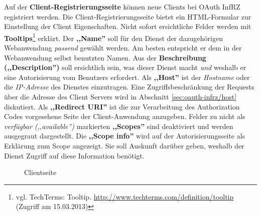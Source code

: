 \documentclass[12pt,a4paper,pointednumbers,abstracton]{scrartcl}
\begin{document}
Auf der \textbf{Client-Registrierungsseite} können neue Clients bei OAuth InfRZ registriert werden.
Die Client-Registrierungsseite bietet ein HTML-Formular zur Einstellung der Client Eigenschaften.
Nicht sofort ersichtliche Felder werden mit \textbf{Tooltips}\footnote{vgl. TechTerms: Tooltip. \url{http://www.techterms.com/definition/tooltip} (Zugriff am 15.03.2013)} erklärt.
Der \textbf{,,Name''} soll für den Dienst der dazugehörigen Webanwendung \emph{passend} gewählt werden.
Am besten entspricht er dem in der Webanwendung selbst benutzten Namen.
Aus der \textbf{Beschreibung (,,Description'')} soll ersichtlich sein, was dieser Dienst macht \emph{und} weshalb er eine Autorisierung vom Benutzers erfordert.
Als \textbf{,,Host''} ist der \emph{Hostname} oder die \emph{IP-Adresse} des Dienstes einzutragen.
Eine Zugriffsbeschränkung der Requests über die Adresse des Client Servers wird in Abschnitt \ref{sec:oauth-infrz/host} diskutiert.
Als \textbf{,,Redirect URI''} ist die zur Verarbeitung des Authorization Codes vorgesehene Seite der Client-Anwendung anzugeben.
Felder zu nicht als \emph{verfügbar (,,available'')} markierten \textbf{,,Scopes''} sind deaktiviert und werden ausgegraut dargestellt.
Die \textbf{,,Scope info''} wird auf der Autorisierungsseite als Erklärung zum Scope angezeigt.
Sie soll Auskunft darüber geben, weshalb der Dienst Zugriff auf diese Information benötigt.

\begin{figure}[h!]
\centering
{}
\caption{Clientseite}
\label{pic:oauth_infrz/client}
\end{figure}
\end{document}
